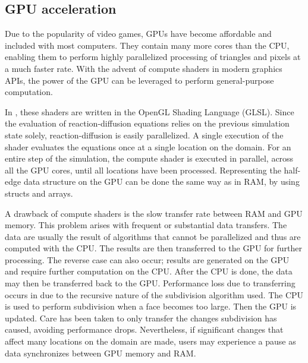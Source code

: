 \subsection{GPU acceleration}
Due to the popularity of video games, GPUs have become affordable and included with most computers. They contain many more cores than the CPU, enabling them to perform highly parallelized processing of triangles and pixels at a much faster rate. With the advent of compute shaders in modern graphics APIs, the power of the GPU can be leveraged to perform general-purpose computation. 

In \ProgramName{}, these shaders are written in the OpenGL Shading Language (GLSL). Since the evaluation of reaction-diffusion equations relies on the previous simulation state solely, reaction-diffusion is easily parallelized. A single execution of the shader evaluates the equations once at a single location on the domain. For an entire step of the simulation, the compute shader is executed in parallel, across all the GPU cores, until all locations have been processed. Representing the half-edge data structure on the GPU can be done the same way as in RAM, by using structs and arrays.

A drawback of compute shaders is the slow transfer rate between RAM and GPU memory. This problem arises with frequent or substantial data transfers. The data are usually the result of algorithms that cannot be parallelized and thus are computed with the CPU. The results are then transferred to the GPU for further processing. The reverse case can also occur; results are generated on the GPU and require further computation on the CPU. After the CPU is done, the data may then be transferred back to the GPU. Performance loss due to transferring occurs in \ProgramName{} due to the recursive nature of the subdivision algorithm used. The CPU is used to perform subdivision when a face becomes too large. Then the GPU is updated. Care has been taken to only transfer the changes subdivision has caused, avoiding performance drops. Nevertheless, if significant changes that affect many locations on the domain are made, users may experience a pause as data synchronizes between GPU memory and RAM. 

